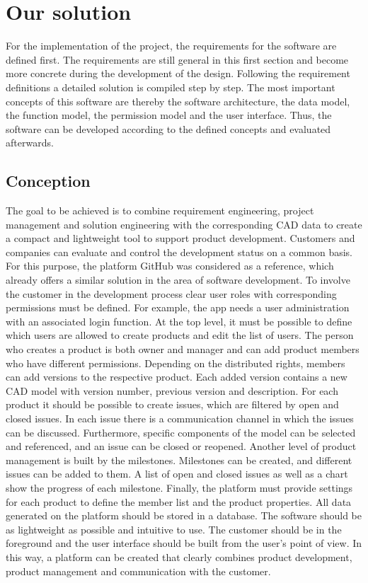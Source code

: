 \section{Our solution}
    \label{sec:contribution} 
    For the implementation of the project, the requirements for the software are defined first. The requirements are still general in this first section and become more concrete during the development of the design. Following the requirement definitions a detailed solution is compiled step by step. The most important concepts of this software are thereby the software architecture, the data model, the function model, the permission model and the user interface. Thus, the software can be developed according to the defined concepts and evaluated afterwards.

    \subsection*{Conception}
    The goal to be achieved is to combine requirement engineering, project management and solution engineering with the corresponding CAD data to create a compact and lightweight tool to support product development. Customers and companies can evaluate and control the development status on a common basis. For this purpose, the platform GitHub was considered as a reference, which already offers a similar solution in the area of software development. To involve the customer in the development process clear user roles with corresponding permissions must be defined. For example, the app needs a user administration with an associated login function. At the top level, it must be possible to define which users are allowed to create products and edit the list of users. The person who creates a product is both owner and manager and can add product members who have different permissions. Depending on the distributed rights, members can add versions to the respective product. Each added version contains a new CAD model with version number, previous version and description. For each product it should be possible to create issues, which are filtered by open and closed issues. In each issue there is a communication channel in which the issues can be discussed. Furthermore, specific components of the model can be selected and referenced, and an issue can be closed or reopened. Another level of product management is built by the milestones. Milestones can be created, and different issues can be added to them. A list of open and closed issues as well as a chart show the progress of each milestone. Finally, the platform must provide settings for each product to define the member list and the product properties. All data generated on the platform should be stored in a database. The software should be as lightweight as possible and intuitive to use. The customer should be in the foreground and the user interface should be built from the user's point of view. In this way, a platform can be created that clearly combines product development, product management and communication with the customer.

